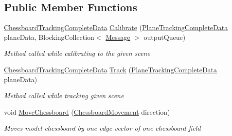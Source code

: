 \subsection*{Public Member Functions}
\begin{DoxyCompactItemize}
\item 
\mbox{\hyperlink{class_chess_tracking_1_1_image_processing_1_1_pipeline_data_1_1_chessboard_tracking_complete_data}{Chessboard\+Tracking\+Complete\+Data}} \mbox{\hyperlink{interface_chess_tracking_1_1_image_processing_1_1_pipeline_parts_1_1_stages_interfaces_1_1_i_chessboard_localization_a123320210fd4312b27bea5f39a7c57f0}{Calibrate}} (\mbox{\hyperlink{class_chess_tracking_1_1_image_processing_1_1_pipeline_data_1_1_plane_tracking_complete_data}{Plane\+Tracking\+Complete\+Data}} plane\+Data, Blocking\+Collection$<$ \mbox{\hyperlink{class_chess_tracking_1_1_multithreading_messages_1_1_message}{Message}} $>$ output\+Queue)
\begin{DoxyCompactList}\small\item\em Method called while calibrating to the given scene \end{DoxyCompactList}\item 
\mbox{\hyperlink{class_chess_tracking_1_1_image_processing_1_1_pipeline_data_1_1_chessboard_tracking_complete_data}{Chessboard\+Tracking\+Complete\+Data}} \mbox{\hyperlink{interface_chess_tracking_1_1_image_processing_1_1_pipeline_parts_1_1_stages_interfaces_1_1_i_chessboard_localization_a198327bd00496b49d385b18622245d38}{Track}} (\mbox{\hyperlink{class_chess_tracking_1_1_image_processing_1_1_pipeline_data_1_1_plane_tracking_complete_data}{Plane\+Tracking\+Complete\+Data}} plane\+Data)
\begin{DoxyCompactList}\small\item\em Method called while tracking given scene \end{DoxyCompactList}\item 
void \mbox{\hyperlink{interface_chess_tracking_1_1_image_processing_1_1_pipeline_parts_1_1_stages_interfaces_1_1_i_chessboard_localization_aa9b487eaeca8782b3901f65b1828d951}{Move\+Chessboard}} (\mbox{\hyperlink{namespace_chess_tracking_1_1_multithreading_messages_1_1_to_processing_af48751428f7a12d314dbbac688726bac}{Chessboard\+Movement}} direction)
\begin{DoxyCompactList}\small\item\em Moves model chessboard by one edge vector of one chessboard field \end{DoxyCompactList}\end{DoxyCompactItemize}


